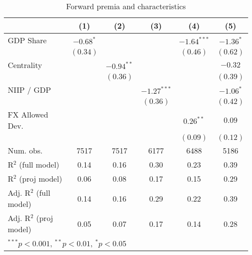 
\begin{table}
\begin{center}
\begin{tabular}{l c c c c c }
\hline
 & (1) & (2) & (3) & (4) & (5) \\
\hline
GDP Share               & $-0.68^{*}$ &              &               & $-1.64^{***}$ & $-1.36^{*}$ \\
                        & $(0.34)$    &              &               & $(0.46)$      & $(0.62)$    \\
Centrality              &             & $-0.94^{**}$ &               &               & $-0.32$     \\
                        &             & $(0.36)$     &               &               & $(0.39)$    \\
NIIP / GDP              &             &              & $-1.27^{***}$ &               & $-1.06^{*}$ \\
                        &             &              & $(0.36)$      &               & $(0.42)$    \\
FX Allowed Dev.         &             &              &               & $0.26^{**}$   & $0.09$      \\
                        &             &              &               & $(0.09)$      & $(0.12)$    \\
\hline
Num. obs.               & 7517        & 7517         & 6177          & 6488          & 5186        \\
R$^2$ (full model)      & 0.14        & 0.16         & 0.30          & 0.23          & 0.39        \\
R$^2$ (proj model)      & 0.06        & 0.08         & 0.17          & 0.15          & 0.29        \\
Adj. R$^2$ (full model) & 0.14        & 0.16         & 0.29          & 0.22          & 0.39        \\
Adj. R$^2$ (proj model) & 0.05        & 0.07         & 0.17          & 0.14          & 0.28        \\
\hline
\multicolumn{6}{l}{\scriptsize{$^{***}p<0.001$, $^{**}p<0.01$, $^*p<0.05$}}
\end{tabular}
\caption{Forward premia and characteristics}
\label{table:fp_char}
\end{center}
\end{table}
